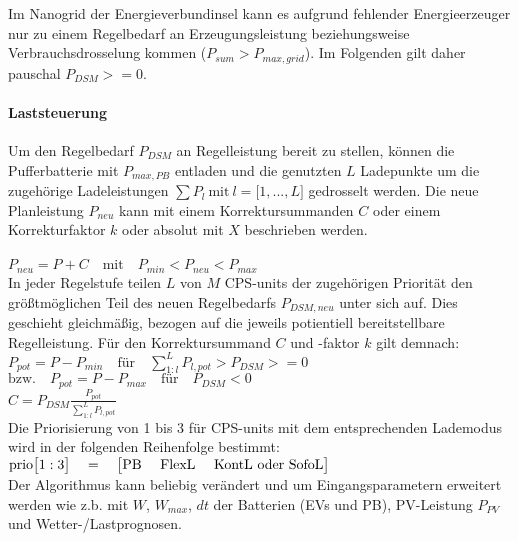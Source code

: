 		
			Im Nanogrid der Energieverbundinsel kann es aufgrund fehlender Energieerzeuger nur zu einem Regelbedarf an Erzeugungsleistung beziehungsweise Verbrauchsdrosselung kommen ($P_{sum}>P_{max,grid}$). Im Folgenden gilt daher pauschal $ P_{DSM} >= 0 $.
			

			
			
		\paragraph{Laststeuerung}
			Um den Regelbedarf $P_{DSM}$ an Regelleistung bereit zu stellen, können die Pufferbatterie mit $P_{max,PB}$ entladen und die genutzten $L$ Ladepunkte um die zugehörige Ladeleistungen $\sum P_{l} ~\text{mit}~ l=\big[1, ..., L\big]$ gedrosselt werden. Die neue Planleistung $P_{neu}$ kann mit einem Korrektursummanden $C$ oder einem Korrekturfaktor $k$ oder absolut mit $X$ beschrieben werden. \\ \\
			$P_{neu} = P + C \quad \text{mit} \quad P_{min} < P_{neu} < P_{max}$ \\   				
			
			In jeder Regelstufe teilen $L$ von $M$ CPS-units der zugehörigen Priorität den größtmöglichen Teil des neuen Regelbedarfs $P_{DSM,neu}$ unter sich auf. Dies geschieht gleichmäßig, bezogen auf die jeweils potientiell bereitstellbare Regelleistung. Für den Korrektursummand $C$ und -faktor $k$ gilt demnach: \\

			$P_{pot} = P - P_{min} \quad \text{für} \quad \sum_{1:l}^{L} P_{l,pot} > P_{DSM} >= 0$\\
            $\text{bzw.} \quad P_{pot} = P - P_{max} \quad \text{für} \quad P_{DSM} < 0 $ \\
			$C = P_{DSM} \frac{P_{pot}}{\sum_{1:l}^{L} P_{l,pot}}$ \\	
			
			Die Priorisierung von 1 bis 3 für CPS-units mit dem entsprechenden Lademodus wird in der folgenden Reihenfolge bestimmt: \\
			$ \text{prio} \big[1:3\big] \quad = \quad \big[\text{PB \quad FlexL \quad KontL oder SofoL}\big]$\\
							
			Der Algorithmus kann beliebig verändert und um Eingangsparametern erweitert werden wie z.b. mit $W$, $W_{max}$, $dt$ der Batterien (EVs und PB), PV-Leistung $P_{PV}$ und Wetter-/Lastprognosen.
			


